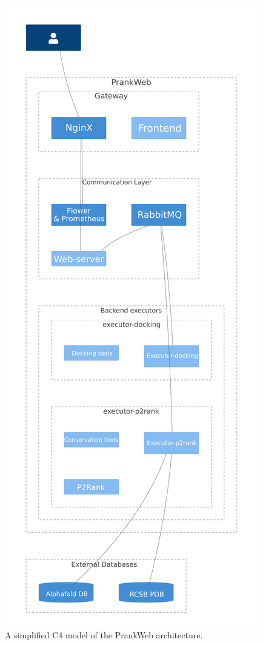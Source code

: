 \begin{figure}
    \centering
    \includegraphics[height=0.95\textheight]{img/architecture.pdf}
    \caption{A simplified C4 model of the PrankWeb architecture.}
    \label{fig:architecture}
\end{figure}

